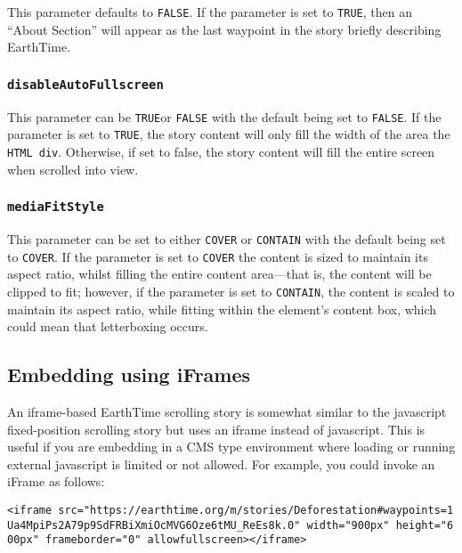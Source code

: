\documentclass[
]{book}
\begin{document}
This parameter defaults to \texttt{FALSE}. If the parameter is set to \texttt{TRUE}, then an ``About Section'' will appear as the last waypoint in the story briefly describing EarthTime.

\hypertarget{disableautofullscreen}{%
\subsubsection*{\texorpdfstring{\texttt{disableAutoFullscreen}}{disableAutoFullscreen}}\label{disableautofullscreen}}


This parameter can be \texttt{TRUE}or \texttt{FALSE} with the default being set to \texttt{FALSE}. If the parameter is set to \texttt{TRUE}, the story content will only fill the width of the area the \texttt{HTML\ div}. Otherwise, if set to false, the story content will fill the entire screen when scrolled into view.

\hypertarget{mediafitstyle}{%
\subsubsection*{\texorpdfstring{\texttt{mediaFitStyle}}{mediaFitStyle}}\label{mediafitstyle}}


This parameter can be set to either \texttt{COVER} or \texttt{CONTAIN} with the default being set to \texttt{COVER}. If the parameter is set to \texttt{COVER} the content is sized to maintain its aspect ratio, whilst filling the entire content area---that is, the content will be clipped to fit; however, if the parameter is set to \texttt{CONTAIN}, the content is scaled to maintain its aspect ratio, while fitting within the element's content box, which could mean that letterboxing occurs.

\hypertarget{embedding-using-iframes}{%
\subsection*{Embedding using iFrames}\label{embedding-using-iframes}}


An iframe-based EarthTime scrolling story is somewhat similar to the javascript fixed-position scrolling story but uses an iframe instead of javascript. This is useful if you are embedding in a CMS type environment where loading or running external javascript is limited or not allowed. For example, you could invoke an iFrame as follows:

\texttt{\textless{}iframe\ src="https://earthtime.org/m/stories/Deforestation\#waypoints=1Ua4MpiPs2A79p9SdFRBiXmiOcMVG6Oze6tMU\_ReEs8k.0"\ width="900px"\ height="600px"\ frameborder="0"\ allowfullscreen\textgreater{}\textless{}/iframe\textgreater{}}
\end{document}
